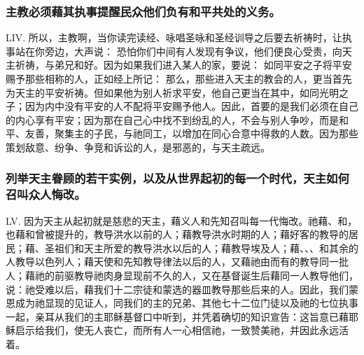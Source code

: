 
\subsubsection{主教必须藉其执事提醒民众他们负有和平共处的义务。}

LIV. 所以，主教啊，当你读完读经、咏唱圣咏和圣经训导之后要去祈祷时，让执事站在你旁边，大声说： 恐怕你们中间有人发现有争议，他们便良心受责，向天主祈祷，与弟兄和好。因为如果我们进入某人的家，要说：  如同平安之子将平安赐予那些相称的人，正如经上所记： 那么，那些进入天主的教会的人，更当首先为天主的平安祈祷。但如果他为别人祈求平安，他自己更当在其中，如同光明之子；因为内中没有平安的人不配将平安赐予他人。因此，首要的是我们必须在自己的内心享有平安；因为那在自己心中找不到纷乱的人，不会与别人争吵，而是和平、友善，聚集主的子民，与祂同工，以增加在同心合意中得救的人数。因为那些策划敌意、纷争、争竞和诉讼的人，是邪恶的，与天主疏远。\par


\subsubsection{列举天主眷顾的若干实例，以及从世界起初的每一个时代，天主如何召叫众人悔改。}

LV. 因为天主从起初就是慈悲的天主，藉义人和先知召叫每一代悔改。祂藉、和，也藉和曾被提升的，教导洪水以前的人；藉教导洪水时期的人；藉好客的教导的居民；藉、圣祖们和天主所爱的教导洪水以后的人；藉教导埃及人；藉、、、和其余的人教导以色列人；藉天使和先知教导律法以后的人，又藉祂由而有的教导同一批人；藉祂的前驱教导祂肉身显现前不久的人，又在基督诞生后藉同一人教导他们，说：祂受难以后，藉我们十二宗徒和蒙选的器皿教导那些后来的人。因此，我们蒙恩成为祂显现的见证人，同我们的主的兄弟、其他七十二位门徒以及祂的七位执事一起，亲耳从我们的主耶稣基督口中听到，并凭着确切的知识宣告：这旨意已藉耶稣启示给我们，使无人丧亡，而所有人一心相信祂，一致赞美祂，并因此永远活着。\par

